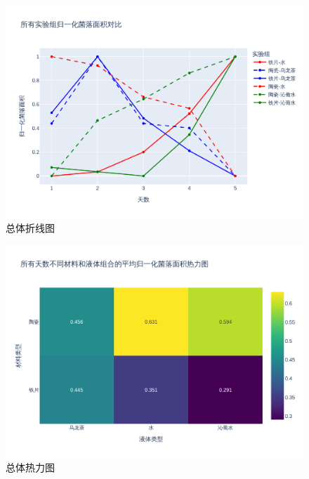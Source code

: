 \documentclass[12pt,a4paper]{ctexart}
\begin{document}
\begin{figure}[H]  %
    \centering  %
    \includegraphics[width=\textwidth]{./plot/General/combined_normalized_line.png}  %
    \caption{总体折线图}  %
    \label{fig:GeneralLine}  %
\end{figure}

\begin{figure}[H]  %
    \centering  %
    \includegraphics[width=\textwidth]{./plot/General/heatmap_normalized_overall.png}  %
    \caption{总体热力图}  %
    \label{fig:GeneralHeat}  %
\end{figure}
\end{document}

